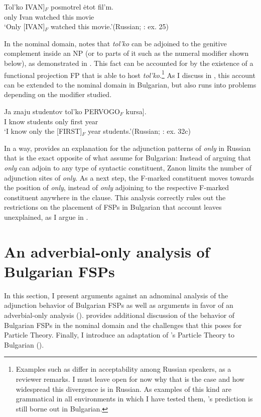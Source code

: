 \documentclass[output=paper,colorlinks,citecolor=brown]{langscibook}
\begin{document}
\ea\label{Zanon:basic5} 
\gll Tol'ko \minsp{[} IVAN]$_{F}$ posmotrel ėtot fil'm. \\
only {} Ivan watched this movie\\
\glt `Only [IVAN]$_{F}$ watched this movie.’\hfill (Russian; \citealt{Zanon2018}: ex. 25)
\z

\largerpage[-2]
\noindent In the nominal domain, \citet[432-433]{Zanon2018} notes that \textit{tol'ko} can be adjoined to the genitive complement inside an NP (or to parts of it such as the numeral modifier shown below), as demonstrated in . This fact can be accounted for by the existence of a functional projection FP that is able to host \textit{tol'ko}.\footnote{Examples such as  differ in acceptability among Russian speakers, as a reviewer remarks. I must leave open for now why that is the case and how widespread this divergence is in Russian. As examples of this kind are grammatical in all environments in which I have tested them, \citeauthor{Zanon2018}'s prediction is still borne out in Bulgarian.} As I discuss in , this account can be extended to the nominal domain in Bulgarian, but also runs into problems depending on the modifier studied. 

\ea\label{Zanon:basic6} 
\gll Ja znaju \minsp{[} studentov tol'ko PERVOGO$_{F}$ kursa]. \\
I know {} students only first year \\
\glt `I know only the [FIRST]$_{F}$ year students.’\hfill (Russian; \citealt{Zanon2018}: ex. 32c)
\z

\noindent In a way, \citet{Zanon2018} provides an explanation for the adjunction patterns of \textit{only} in Russian that is the exact opposite of what \citet{TishevaDzhonova2003} assume for Bulgarian: Instead of arguing that \textit{only} can adjoin to any type of syntactic constituent, Zanon limits the number of adjunction sites of \textit{only}. As a next step, the F-marked constituent moves towards the position of \textit{only}, instead of \textit{only} adjoining to the respective F-marked constituent anywhere in the clause. This analysis correctly rules out the restrictions on the placement of FSPs in Bulgarian that  account leaves unexplained, as I argue in . 

\section{An adverbial-only analysis of Bulgarian FSPs}\label{sec:3}
In this section, I present arguments against an adnominal analysis of the adjunction behavior of Bulgarian FSPs as well as arguments in favor of an adverbial-only analysis ().  provides additional discussion of the behavior of Bulgarian FSPs in the nominal domain and the challenges that this poses for  Particle Theory. Finally, I introduce an adaptation of \citeauthor{BuringHartmann2001}'s Particle Theory to Bulgarian ().  
\end{document}
